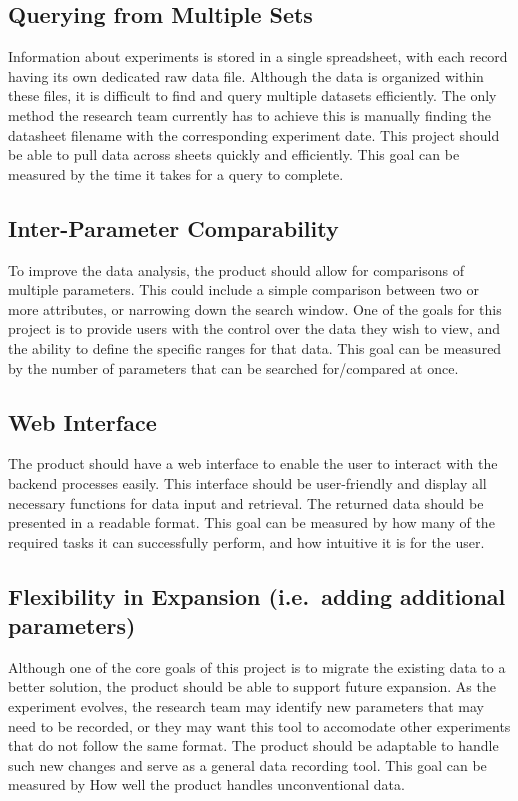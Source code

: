 \documentclass{article}
\begin{document}
\subsection{Querying from Multiple Sets}
Information about experiments is stored in a single spreadsheet, with each
record having its own dedicated raw data file. Although the data is organized
within these files, it is difficult to find and query multiple datasets
efficiently. The only method the research team currently has to achieve this is
manually finding the datasheet filename with the corresponding experiment date.
This project should be able to pull data across sheets quickly and efficiently.
This goal can be measured by the time it takes for a query to complete.

\subsection{Inter-Parameter Comparability}
To improve the data analysis, the product should allow for comparisons of
multiple parameters. This could include a simple comparison between two or more
attributes, or narrowing down the search window. One of the goals for this
project is to provide users with the control over the data they wish to view,
and the ability to define the specific  ranges for that data. This goal can be
measured by the number of parameters that can be searched for/compared at once.

\subsection{Web Interface}
The product should have a web interface to enable the user to interact with the
backend processes easily.
This interface should be user-friendly and display all necessary functions for
data input and retrieval. The returned data should be presented in a readable
format. This goal can be measured by how many of the required tasks it can
successfully perform, and how intuitive it is for the user.

\subsection{Flexibility in Expansion (i.e.\ adding additional parameters)}
Although one of the core goals of this project is to migrate the existing data
to a better solution, the product should be able to support future expansion. As
the experiment evolves, the research team may identify new parameters that may
need to be recorded, or they may want this tool to accomodate other experiments
that do not follow the same format. The product should be adaptable to handle
such new changes and serve as a general data recording tool. This goal can be
measured by How well the product handles unconventional data.
\end{document}
